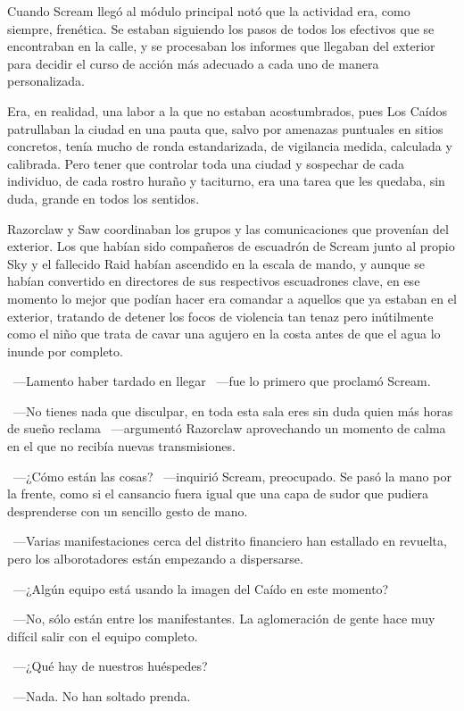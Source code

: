 Cuando Scream llegó al módulo principal notó que la actividad era, como siempre, frenética. Se estaban siguiendo los pasos de todos los efectivos que se encontraban en la calle, y se procesaban los informes que llegaban del exterior para decidir el curso de acción más adecuado a cada uno de manera personalizada.

Era, en realidad, una labor a la que no estaban acostumbrados, pues Los Caídos patrullaban la ciudad en una pauta que, salvo por amenazas puntuales en sitios concretos, tenía mucho de ronda estandarizada, de vigilancia medida, calculada y calibrada. Pero tener que controlar toda una ciudad y sospechar de cada individuo, de cada rostro huraño y taciturno, era una tarea que les quedaba, sin duda, grande en todos los sentidos.

Razorclaw y Saw coordinaban los grupos y las comunicaciones que provenían del exterior. Los que habían sido compañeros de escuadrón de Scream junto al propio Sky y el fallecido Raid habían ascendido en la escala de mando, y aunque se habían convertido en directores de sus respectivos escuadrones clave, en ese momento lo mejor que podían hacer era comandar a aquellos que ya estaban en el exterior, tratando de detener los focos de violencia tan tenaz pero inútilmente como el niño que trata de cavar una agujero en la costa antes de que el agua lo inunde por completo.

~---Lamento haber tardado en llegar ~---fue lo primero que proclamó Scream.

~---No tienes nada que disculpar, en toda esta sala eres sin duda quien más horas de sueño reclama ~---argumentó Razorclaw aprovechando un momento de calma en el que no recibía nuevas transmisiones.

~---¿Cómo están las cosas? ~---inquirió Scream, preocupado. Se pasó la mano por la frente, como si el cansancio fuera igual que una capa de sudor que pudiera desprenderse con un sencillo gesto de mano.

~---Varias manifestaciones cerca del distrito financiero han estallado en revuelta, pero los alborotadores están empezando a dispersarse.

~---¿Algún equipo está usando la imagen del Caído en este momento?

~---No, sólo están entre los manifestantes. La aglomeración de gente hace muy difícil salir con el equipo completo.

~---¿Qué hay de nuestros huéspedes?

~---Nada. No han soltado prenda.

